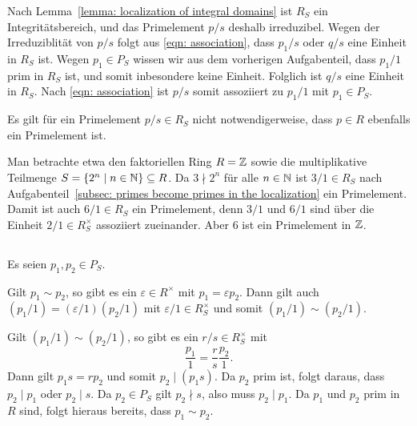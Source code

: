 \documentclass[a4paper,10pt,numbers=noenddot]{scrartcl}
\begin{document}
Nach Lemma~\ref{lemma: localization of integral domains} ist $R_S$ ein Integritätsbereich, und das Primelement $p/s$ deshalb irreduzibel.
Wegen der Irreduziblität von $p/s$ folgt aus \eqref{eqn: association}, dass $p_1/s$ oder $q/s$ eine Einheit in $R_S$ ist.
Wegen $p_1 \in P_S$ wissen wir aus dem vorherigen Aufgabenteil, dass $p_1/1$ prim in $R_S$ ist, und somit inbesondere keine Einheit.
Folglich ist $q/s$ eine Einheit in $R_S$.
Nach \eqref{eqn: association} ist $p/s$ somit assoziiert zu $p_1/1$ mit $p_1 \in P_S$.

\begin{warning}
  Es gilt für ein Primelement $p/s \in R_S$ nicht notwendigerweise, dass $p \in R$ ebenfalls ein Primelement ist.
  
  Man betrachte etwa den faktoriellen Ring $R = \mathbb{Z}$ sowie die multiplikative Teilmenge $S = \{2^n \mid n \in \mathbb{N}\} \subseteq R$.
  Da $3 \nmid 2^n$ für alle $n \in \mathbb{N}$ ist $3/1 \in R_S$ nach Aufgabenteil~\ref{subsec: primes become primes in the localization} ein Primelement.
  Damit ist auch $6/1 \in R_S$ ein Primelement, denn $3/1$ und $6/1$ sind über die Einheit $2/1 \in R_S^{\times}$ assoziiert zueinander.
  Aber $6$ ist ein Primelement in $\mathbb{Z}$.
\end{warning}






\subsection{}

Es seien $p_1, p_2 \in P_S$.

Gilt $p_1 \sim p_2$, so gibt es ein $\varepsilon \in R^\times$ mit $p_1 = \varepsilon p_2$.
Dann gilt auch $(p_1/1) = (\varepsilon/1)(p_2/1)$ mit $\varepsilon/1 \in R_S^\times$ und somit $(p_1/1) \sim (p_2/1)$.

Gilt $(p_1/1) \sim (p_2/1)$, so gibt es ein $r/s \in R_S^\times$ mit
\[
    \frac{p_1}{1}
  = \frac{r}{s} \frac{p_2}{1}.
\]
Dann gilt $p_1 s = r p_2$ und somit $p_2 \mid (p_1 s)$.
Da $p_2$ prim ist, folgt daraus, dass $p_2 \mid p_1$ oder $p_2 \mid s$.
Da $p_2 \in P_S$ gilt $p_2 \nmid s$, also muss $p_2 \mid p_1$.
Da $p_1$ und $p_2$ prim in $R$ sind, folgt hieraus bereits, dass $p_1 \sim p_2$.
\end{document}
